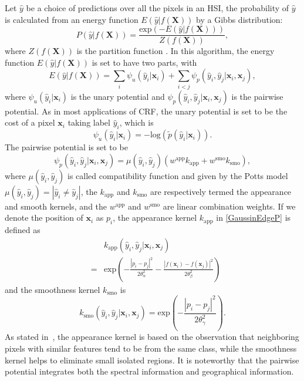 \documentclass[]{article}
\newcommand{\red}{\color{black}}
\newcommand{\magentaso}{\color{black}}
\begin{document}
Let $\hat{y}$ be a choice of predictions over all the pixels in an HSI, the probability of $\hat{y}$ is calculated from
an energy function $E(\hat{y}|f(\mathbf{X}))$ by a Gibbs distribution:
\[
P(\hat{y}|f(\mathbf{X})) = \frac{\mathrm{exp}(-E(\hat{y}|f(\mathbf{X})))}{Z(f(\mathbf{X}))},
\]
where $Z(f(\mathbf{X}))$ is the partition function \cite{lafferty2001conditional}.
In this algorithm, the energy function $E(\hat{y}|f(\mathbf{X}))$ is set to have two parts, with
\[
E(\hat{y}|f(\mathbf{X})) = \sum_{i} \psi_u(\hat{y}_i|\mathbf{x}_i) + \sum_{i<j}\psi_p(\hat{y}_i,\hat{y}_j|\mathbf{x}_i,\mathbf{x}_j),
\]
where $\psi_u(\hat{y}_i|\mathbf{x}_i)$ is the unary potential and 
$\psi_p(\hat{y}_i,\hat{y}_j|\mathbf{x}_i,\mathbf{x}_j)$
is the pairwise potential.
As in most applications of CRF, the unary potential is set {\magentaso to be} the cost of a pixel $\mathbf{x}_i$ taking label $\hat{y}_i$,
which is
\begin{equation}\label{unary}
\psi_u(\hat{y}_i|\mathbf{x}_i) = -\mathrm{log}(\tilde{p}(\hat{y}_i|\mathbf{x}_i)).
\end{equation}
The pairwise potential is set to be
	\begin{equation}\label{GaussinEdgeP}
	\psi_p(\hat{y}_i,\hat{y}_j|\mathbf{x}_i,\mathbf{x}_j) = \mu(\hat{y}_i,\hat{y}_j)(w^{\mathrm{app}}k_{\mathrm{app}}+
	w^{\mathrm{smo}}k_{\mathrm{smo}}),
	\end{equation}
	{\red where $\mu(\hat{y}_i,\hat{y}_j)$ is called compatibility function and given by the Potts model
	$\mu(\hat{y}_i,\hat{y}_j)=|\hat{y}_i\neq \hat{y}_j|$, 
	the $k_{\mathrm{app}}$ and $k_{\mathrm{smo}}$ are respectively termed the appearance and smooth kernels, 
	and the $w^{\mathrm{app}}$ and $w^{\mathrm{smo}}$ are linear combination weights.}
	If we denote the position of $\mathbf{x}_i$ as $p_i$, the appearance kernel $k_{\mathrm{app}}$ in \eqref{GaussinEdgeP} is defined as
	\begin{eqnarray}
	&&k_{\mathrm{app}}(\hat{y}_i,\hat{y}_j|\mathbf{x}_i,\mathbf{x}_j) \nonumber \\
	&=&\mathrm{exp}\left(-\frac{|p_i-p_j|^2}{2\theta_\alpha^2}-\frac{|f(\mathbf{x}_i)-f(\mathbf{x}_j)|^2}{2\theta_\beta^2}\right) \label{euclidean_crf}
	\end{eqnarray}
	and the smoothness kernel $k_{\mathrm{smo}}$ is
	\[k_{\mathrm{smo}}(\hat{y}_i,\hat{y}_j|\mathbf{x}_i,\mathbf{x}_j) =
	\mathrm{exp}\left(-\frac{|p_i-p_j|^2}{2\theta_\gamma^2}\right).
	\]
As stated in~\cite{krahenbuhl2011efficient}, the appearance kernel is based on the observation 
that neighboring pixels with similar features tend to be from the same class, 
while the smoothness kernel helps to eliminate small isolated regions.
It is noteworthy that the pairwise potential integrates both the spectral information and 
geographical information.
\end{document}
